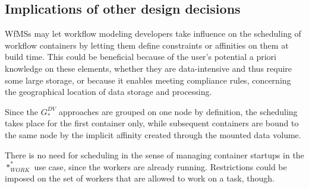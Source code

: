   \subsection{Implications of other design decisions} %
  \label{ssub:implications_of_other_design_decisions}
    \acp{WfMS} may let workflow modeling developers take influence on the scheduling of workflow containers by letting them define constraints or affinities on them at build time. This could be beneficial because of the user's potential a priori knowledge on these elements, \eg whether they are data-intensive and thus require some large storage, or because it enables meeting compliance rules, \eg concerning the geographical location of data storage and processing.

    Since the $G_{*}^{DV}$ approaches are grouped on one node by definition, the scheduling takes place for the first container only, while subsequent containers are bound to the same node by the implicit affinity created through the mounted data volume.

    There is no need for scheduling in the sense of managing container startups in the $*_{WORK}^{*}$ use case, since the workers are already running. Restrictions could be imposed on the set of workers that are allowed to work on a task, though.
